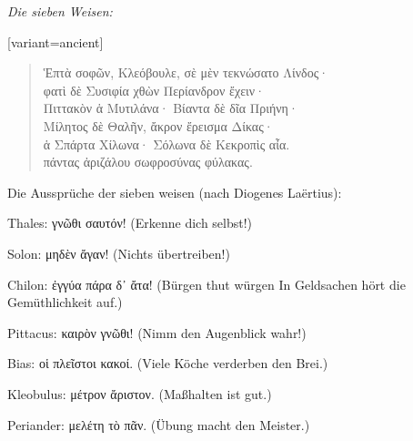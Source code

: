 \noindent \begin{center}
\emph{Die sieben Weisen:}
\par\end{center}
\begin{greek}[variant=ancient]%
\begin{quote}
Ἑπτὰ σοφῶν, Κλεόβουλε, σὲ μὲν τεκνώσατο Λίνδος·\\
φατὶ δὲ Συσιφία χθὼν Περίανδρον ἔχειν·\\
Πιττακὸν ἁ Μυτιλάνα· Βίαντα δὲ δῖα Πριήνη·\\
Μίλητος δὲ Θαλῆν, ἄκρον ἔρεισμα Δίκας·\\
ἁ Σπάρτα Χίλωνα· Σόλωνα δὲ Κεκροπὶς αἶα.\\
πάντας ἀριζάλου σωφροσύνας φύλακας. 
\end{quote}
\end{greek}%
\noindent \begin{center}
Die Aus\textcompwordmark{}sprüche der sieben weisen (nach Diogenes
Laërtius):
\par\end{center}

Thales: \textgreek[variant=ancient]{γνῶθι σαυτόν!} (Erkenne dich selbst!)

Solon: \textgreek[variant=ancient]{μηδὲν ἄγαν!} (Nichts übertreiben!)

Chilon: \textgreek[variant=ancient]{ἐγγύα πάρα δ᾽ ἄτα!} (Bürgen thut
würgen In Geldsachen hört die Gemüthlichkeit auf.)

Pittacus: \textgreek[variant=ancient]{καιρὸν γνῶθι!} (Nimm den Augenblick
wahr!)

Bias: \textgreek[variant=ancient]{οἱ πλεῖστοι κακοί.} (Viele Köche
verderben den Brei.)

Kleobulus: \textgreek[variant=ancient]{μέτρον ἄριστον.} (Maßhalten
ist gut.)

Periander: \textgreek[variant=ancient]{μελέτη τὸ πᾶν.} (Übung macht
den Meister.)

